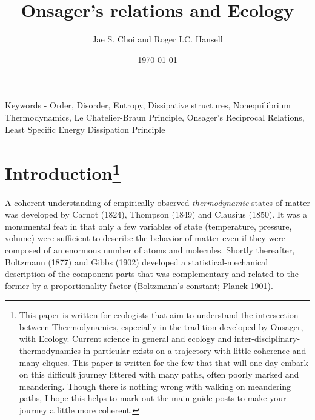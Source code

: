 \documentclass[11pt,letterpaper,]{paper}
\author[ ]{Jae S. Choi and Roger I.C. Hansell}
\date{\today}
\title{Onsager's relations and Ecology}
\begin{document}
\maketitle %


Keywords - Order, Disorder, Entropy, Dissipative structures,
Nonequilibrium Thermodynamics, Le Chatelier-Braun Principle, Onsager's
Reciprocal Relations, Least Specific Energy Dissipation Principle


 
  
\section[Introduction]{\texorpdfstring{Introduction\footnote{This paper
  is written for ecologists that aim to understand the intersection
  between Thermodynamics, especially in the tradition developed by
  Onsager, with Ecology. Current science in general and ecology and
  inter-disciplinary-thermodynamics in particular exists on a trajectory
  with little coherence and many cliques. This paper is written for the
  few that that will one day embark on this difficult journey littered
  with many paths, often poorly marked and meandering. Though there is
  nothing wrong with walking on meandering paths, I hope this helps to
  mark out the main guide posts to make your journey a little more
  coherent.}}{Introduction}}\label{introduction1}

A coherent understanding of empirically observed \emph{thermodynamic}
states of matter was developed by Carnot (1824), Thompson (1849) and
Clausius (1850). It was a monumental feat in that only a few variables
of state (temperature, pressure, volume) were sufficient to describe the
behavior of matter even if they were composed of an enormous number of
atoms and molecules. Shortly thereafter, Boltzmann (1877) and Gibbs
(1902) developed a statistical-mechanical description of the component
parts that was complementary and related to the former by a
proportionality factor (Boltzmann's constant; Planck 1901).
\end{document}
